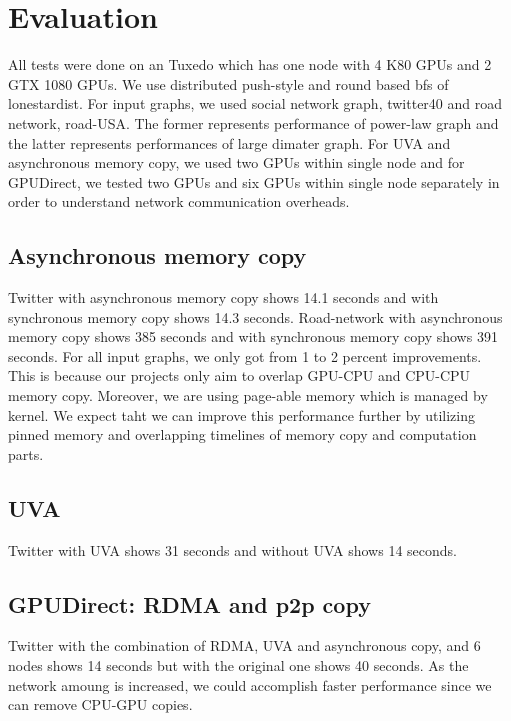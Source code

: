 \section{Evaluation}
\label{evaluation}
All tests were done on an Tuxedo which has one node with 4 K80 GPUs and 2 GTX 1080 GPUs.
We use distributed push-style and round based bfs of lonestardist. For input graphs, we used 
social network graph, twitter40 and road network, road-USA. The former represents 
performance of power-law graph and the latter represents performances of large dimater graph. 
For UVA and asynchronous memory copy, we used two GPUs within single node and 
for GPUDirect, we tested two GPUs and six GPUs within single node separately in order to understand
network communication overheads.

\subsection{Asynchronous memory copy}
Twitter with asynchronous memory copy shows 14.1 seconds and with synchronous memory copy shows 
14.3 seconds. Road-network with asynchronous memory copy shows 385 seconds and 
with synchronous memory copy shows 391 seconds.
For all input graphs, we only got from 1 to 2 percent improvements.
This is because our projects only aim to overlap GPU-CPU and CPU-CPU memory copy.
Moreover, we are using page-able memory which is managed by kernel.
We expect taht we can improve this performance further by utilizing pinned memory and overlapping 
timelines of memory copy and computation parts.

\subsection{UVA}
Twitter with UVA shows 31 seconds and without UVA shows 14 seconds.

\subsection{GPUDirect: RDMA and p2p copy}
Twitter with the combination of RDMA, UVA and asynchronous copy, and 6 nodes shows 14 seconds
but with the original one shows 40 seconds. 
As the network amoung is increased, we could accomplish faster performance since 
we can remove CPU-GPU copies.
